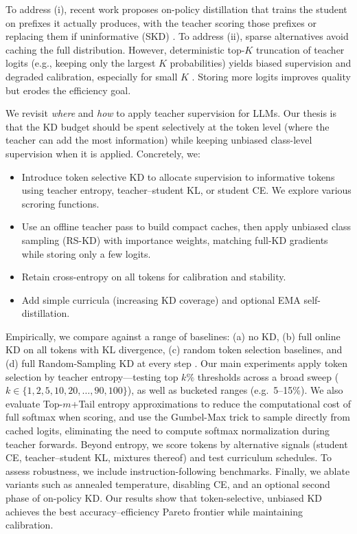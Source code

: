 \documentclass[11pt]{article}
\begin{document}
To address (i), recent work proposes on-policy distillation that trains the student on prefixes it actually produces, with the teacher scoring those prefixes \citep{agarwal2024gkd} or replacing them if uninformative (SKD) \citep{xu2024speculative}.
To address (ii), sparse alternatives avoid caching the full distribution. However, deterministic top-$K$ truncation of teacher logits (e.g., keeping only the largest $K$ probabilities) yields biased supervision and degraded calibration, especially for small $K$ \citep{anshumann2025sparse,shum2024first}.
Storing more logits improves quality but erodes the efficiency goal.

We revisit \emph{where} and \emph{how} to apply teacher supervision for LLMs.
Our thesis is that the KD budget should be spent selectively at the token level (where the teacher can add the most information) while keeping unbiased class-level supervision when it is applied.
Concretely, we:

\begin{itemize}
	\item Introduce token selective KD to allocate supervision to informative tokens using teacher entropy, teacher--student KL, or student CE. We explore various scroring functions.
	\item Use an offline teacher pass to build compact caches, then apply unbiased class sampling (RS-KD) with importance weights, matching full-KD gradients while storing only a few logits.
	\item Retain cross-entropy on all tokens for calibration and stability.
	\item Add simple curricula (increasing KD coverage) and optional EMA self-distillation.
\end{itemize}

Empirically, we compare against a range of baselines: (a) no KD, (b) full online KD on all tokens with KL divergence, (c) random token selection baselines, and (d) full Random-Sampling KD at every step \citep{anshumann2025sparse}.
Our main experiments apply token selection by teacher entropy---testing top $k\%$ thresholds across a broad sweep ($k \in \{1,2,5,10,20,\ldots,90,100\}$), as well as bucketed ranges (e.g.\ 5--15\%).
We also evaluate Top-$m$+Tail entropy approximations to reduce the computational cost of full softmax when scoring, and use the Gumbel-Max trick to sample directly from cached logits, eliminating the need to compute softmax normalization during teacher forwards.
Beyond entropy, we score tokens by alternative signals (student CE, teacher--student KL, mixtures thereof) and test curriculum schedules.
To assess robustness, we include instruction-following benchmarks.
Finally, we ablate variants such as annealed temperature, disabling CE, and an optional second phase of on-policy KD.
Our results show that token-selective, unbiased KD achieves the best accuracy--efficiency Pareto frontier while maintaining calibration.
\end{document}
